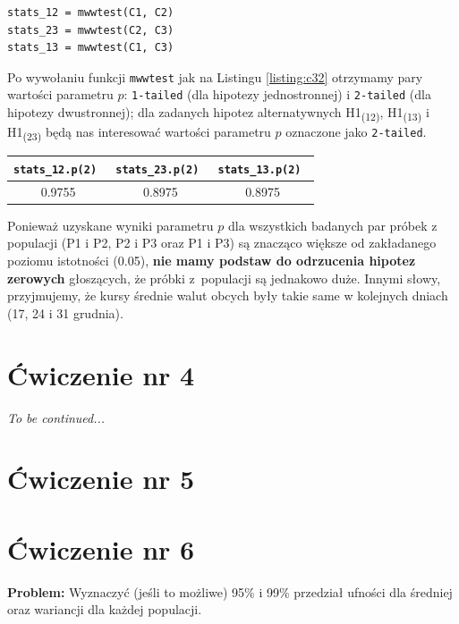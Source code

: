 \documentclass[12pt, a4paper]{article}
\begin{document}
\begin{lstlisting}[frame=single,label={listing:c32},caption={badanie, czy wartości próbek z populacji są jednakowo duże.},captionpos=b]
stats_12 = mwwtest(C1, C2)
stats_23 = mwwtest(C2, C3)
stats_13 = mwwtest(C1, C3)
\end{lstlisting}

Po wywołaniu funkcji \texttt{mwwtest} jak na Listingu \ref{listing:c32} otrzymamy pary wartości parametru $p$: \texttt{1-tailed} (dla hipotezy jednostronnej) i \texttt{2-tailed} (dla hipotezy dwustronnej); dla zadanych hipotez alternatywnych H1\textsubscript{(12)}, H1\textsubscript{(13)} i H1\textsubscript{(23)} będą nas interesować wartości parametru $p$ oznaczone jako \texttt{2-tailed}.

\begin{center}
  \begin{tabular}{|c|c|c|}\hline
    \tt stats\_12.p(2) & \tt stats\_23.p(2) & \tt stats\_13.p(2) \\\hline
    0.9755 & 0.8975 & 0.8975 \\\hline
  \end{tabular}
  \label{table:c32}
\end{center}

Ponieważ uzyskane wyniki parametru $p$ dla wszystkich badanych par próbek z populacji (P1 i P2, P2 i P3 oraz P1 i P3) są znacząco większe od zakładanego poziomu istotności (0.05), \textbf{nie mamy podstaw do odrzucenia hipotez zerowych} głoszących, że próbki z~populacji są jednakowo duże. Innymi słowy, przyjmujemy, że kursy średnie walut obcych były takie same w kolejnych dniach (17, 24 i 31 grudnia).

\section*{Ćwiczenie nr 4}
\textit{To be continued...}

\section*{Ćwiczenie nr 5}

\section*{Ćwiczenie nr 6}
\begin{hangparas}{2.1cm}{1}
  \textbf{Problem:} Wyznaczyć (jeśli to możliwe) 95\% i 99\% przedział ufności dla średniej oraz wariancji dla każdej populacji.\newline
\end{hangparas}
\end{document}
